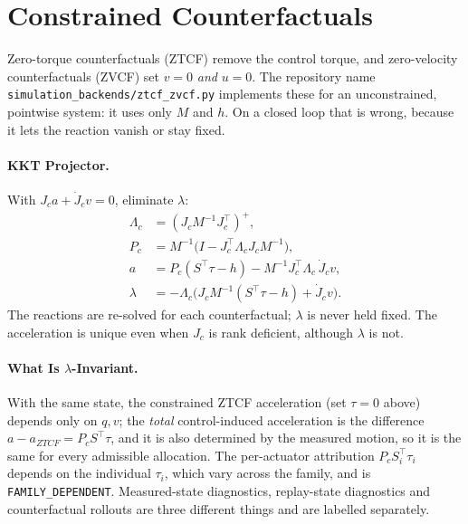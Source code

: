\documentclass[11pt,a4paper]{article}
\begin{document}
\section{Constrained Counterfactuals}
\label{sec:cf}

Zero-torque counterfactuals (ZTCF) remove the control torque, and zero-velocity
counterfactuals (ZVCF) set $v=0$ \emph{and} $u=0$.  The repository name
\texttt{simulation\_backends/ztcf\_zvcf.py} implements these for an
unconstrained, pointwise system: it uses only $M$ and $h$.  On a closed loop
that is wrong, because it lets the reaction vanish or stay fixed.

\paragraph{KKT Projector.}
With $J_ca+\dot J_cv=0$, eliminate $\lambda$:
\begin{align}
\Lambda_c&=(J_cM^{-1}J_c^{\top})^{+},\\
P_c&=M^{-1}\bigl(I-J_c^{\top}\Lambda_cJ_cM^{-1}\bigr),\\
a&=P_c(S^{\top}\tau-h)-M^{-1}J_c^{\top}\Lambda_c\,\dot J_cv,\\
\lambda&=-\Lambda_c\bigl(J_cM^{-1}(S^{\top}\tau-h)+\dot J_cv\bigr).
\end{align}
The reactions are re-solved for each counterfactual; $\lambda$ is never held
fixed.  The acceleration is unique even when $J_c$ is rank deficient, although
$\lambda$ is not.

\paragraph{What Is $\lambda$-Invariant.}
With the same state, the constrained ZTCF acceleration (set $\tau=0$ above)
depends only on $q,v$; the \emph{total} control-induced acceleration is the
difference $a-a_{ZTCF}=P_cS^{\top}\tau$, and it is also determined by the
measured motion, so it is the same for every admissible allocation.  The
per-actuator attribution $P_cS_i^{\top}\tau_i$ depends on the individual
$\tau_i$, which vary across the family, and is \texttt{FAMILY\_DEPENDENT}.
Measured-state diagnostics, replay-state diagnostics and counterfactual
rollouts are three different things and are labelled separately.
\end{document}
